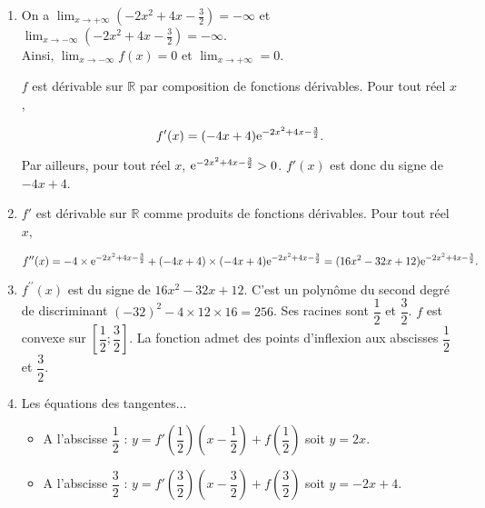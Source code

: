 \documentclass[11pt,fleqn, openany]{book} %
\begin{document}
\begin{solution}\hspace{0pt}
\begin{enumerate}
\item  On a \(\displaystyle\lim_{x \to +\infty}\left(-2x^2+4x-\frac{3}{2}\right)=-\infty\) et \(\displaystyle\lim_{x \to -\infty}\left(-2x^2+4x-\frac{3}{2}\right)=-\infty\). \\ Ainsi, \(\displaystyle\lim_{x \to -\infty}f(x)=0\)  et \(\displaystyle\lim_{x \to +\infty}=0\).

\(f\) est dérivable sur \(\mathbb{R}\) par composition de fonctions dérivables. Pour tout réel \(x\), 

\[f'(x)=(-4x+4)\mathrm{e}^{-2x^2+4x-\frac{3}{2}}.\]

Par ailleurs, pour tout réel \(x\), \(\mathrm{e}^{-2x^2+4x-\frac{3}{2}}>0\). \(f'(x)\) est donc du signe de \(-4x+4\).


\begin{center}
\end{center}

\item \(f'\) est dérivable sur \(\mathbb{R}\) comme produits de fonctions dérivables. Pour tout réel \(x\), 


\[ f^{\prime\prime}(x)=-4 \times \mathrm{e}^{-2x^2+4x-\frac{3}{2}} + (-4x+4)\times(-4x+4)\mathrm{e}^{-2x^2+4x-\frac{3}{2}}=(16x^2-32x+12)\mathrm{e}^{-2x^2+4x-\frac{3}{2}}.\]

\item \(f^{\prime\prime}(x)\) est du signe de \(16x^2-32x+12\). C'est un polynôme du second degré de discriminant \((-32)^2-4\times12\times16=256\). Ses racines sont \(\dfrac{1}{2}\) et \(\dfrac{3}{2}\). \(f\) est convexe sur \(\left[\dfrac{1}{2};\dfrac{3}{2}\right]\). La fonction admet des points d'inflexion aux abscisses \(\dfrac{1}{2}\) et \(\dfrac{3}{2}\).

\item Les équations des tangentes...
\begin{itemize}
\item A l'abscisse \(\dfrac{1}{2}\) : \(y=f'\left(\dfrac{1}{2}\right)\left(x-\dfrac{1}{2}\right)+f\left(\dfrac{1}{2}\right)\) soit \(y=2x\).
\item A l'abscisse \(\dfrac{3}{2}\) : \(y=f'\left(\dfrac{3}{2}\right)\left(x-\dfrac{3}{2}\right)+f\left(\dfrac{3}{2}\right)\) soit \(y=-2x+4\).
\end{itemize}


\end{enumerate}
\end{solution}
\end{document}

